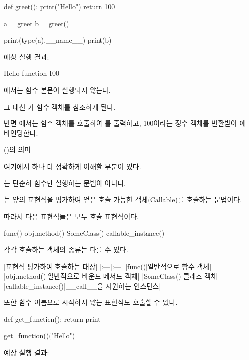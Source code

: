 \begin{dhkcode}
def greet():
    print("Hello")
    return 100

a = greet
b = greet()

print(type(a).__name__)
print(b)
\end{dhkcode}

예상 실행 결과:

\begin{dhkzsh}
Hello
function
100
\end{dhkzsh}

에서는 함수 본문이 실행되지 않는다.

그 대신 가 함수 객체를 참조하게 된다.

반면 에서는 함수 객체를 호출하여 를 출력하고, 100이라는 정수 객체를 반환받아 에 바인딩한다.

\begin{dhknote}
\begin{dhksmry}[centered]
()의 의미
\end{dhksmry}
\end{dhknote}

여기에서 하나 더 정확하게 이해할 부분이 있다.

\zsh{()}는 단순히 함수만 실행하는 문법이 아니다.

\zsh{()}는 앞의 표현식을 평가하여 얻은 호출 가능한 객체(Callable)를 호출하는 문법이다.

따라서 다음 표현식들은 모두 호출 표현식이다.

\begin{dhkcode}
func()
obj.method()
SomeClass()
callable_instance()
\end{dhkcode}

각각 호출하는 객체의 종류는 다를 수 있다.

\begin{dhktable}
|표현식|평가하여 호출하는 대상|
|:---|:---|
|func()|일반적으로 함수 객체|
|obj.method()|일반적으로 바운드 메서드 객체|
|SomeClass()|클래스 객체|
|callable_instance()|__call__을 지원하는 인스턴스|
\end{dhktable}

또한 함수 이름으로 시작하지 않는 표현식도 호출할 수 있다.

\begin{dhkcode}
def get_function():
    return print

get_function()("Hello")
\end{dhkcode}

예상 실행 결과:

